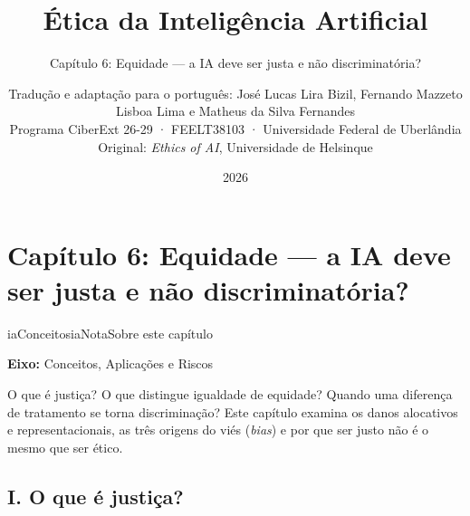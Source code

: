 \documentclass[
  11pt,
]{article}
\title{Ética da Inteligência Artificial}
\subtitle{Capítulo 6: Equidade --- a IA deve ser justa e não
discriminatória?}
\author{Tradução e adaptação para o português: José Lucas Lira Bizil,
Fernando Mazzeto Lisboa Lima e Matheus da Silva Fernandes\\
Programa CiberExt 26-29 · FEELT38103 · Universidade Federal de
Uberlândia\\
Original: \emph{Ethics of AI}, Universidade de Helsinque}
\date{2026}
\newenvironment{nota}[1][Nota]{\begin{iabox}{iaConceitos}{iaNota}{#1}}{\end{iabox}}
\begin{document}
\maketitle

{
\hypersetup{linkcolor=iaConceitos}
\setcounter{tocdepth}{3}
\tableofcontents
}
\section{Capítulo 6: Equidade --- a IA deve ser justa e não
discriminatória?}\label{capuxedtulo-6-equidade-a-ia-deve-ser-justa-e-nuxe3o-discriminatuxf3ria}

\begin{nota}[Sobre este capítulo]

\textbf{Eixo:} Conceitos, Aplicações e Riscos

O que é justiça? O que distingue igualdade de equidade? Quando uma
diferença de tratamento se torna discriminação? Este capítulo examina os
danos alocativos e representacionais, as três origens do viés
(\emph{bias}) e por que ser justo não é o mesmo que ser ético.

\end{nota}

\subsection{I. O que é justiça?}\label{i.-o-que-uxe9-justiuxe7a}
\end{document}
